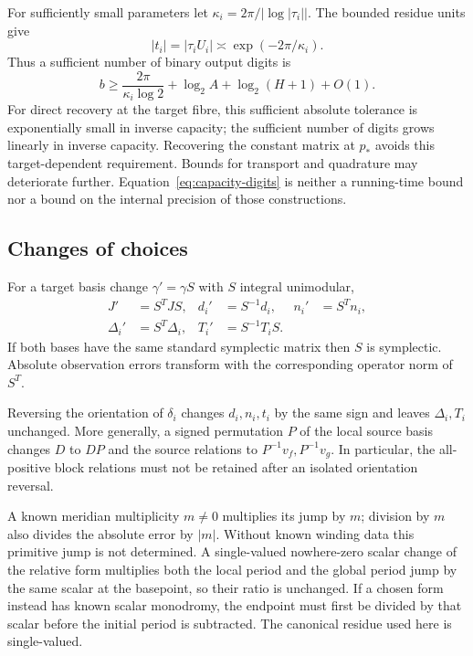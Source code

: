 For sufficiently small parameters let
$\kappa_i=2\pi/|\log|\tau_i||$. The bounded residue units give
\[
 |t_i|=|\tau_iU_i|\asymp
                     \exp(-2\pi/\kappa_i).
\]
Thus a sufficient number of binary output digits is
\begin{equation}\label{eq:capacity-digits}
 b\ge \frac{2\pi}{\kappa_i\log2}
       +\log_2A+\log_2(H+1)+O(1).
\end{equation}
For direct recovery at the target fibre, this sufficient absolute
tolerance is exponentially small in inverse capacity; the sufficient
number of digits grows linearly in inverse capacity. Recovering the
constant matrix at $p_*$ avoids this target-dependent requirement.
Bounds for transport and quadrature may deteriorate further.
Equation~\eqref{eq:capacity-digits} is neither a running-time bound
nor a bound on the internal precision of those constructions.

\subsection{Changes of choices}

For a target basis change $\gamma'=\gamma S$ with $S$ integral
unimodular,
\begin{equation}\label{eq:target-covariance}
 \begin{aligned}
 J'&=S^TJS,&d_i'&=S^{-1}d_i,& n_i'&=S^Tn_i,\\
 \Delta_i'&=S^T\Delta_i,&T_i'&=S^{-1}T_iS.
 \end{aligned}
\end{equation}
If both bases have the same standard symplectic matrix then $S$ is
symplectic. Absolute observation errors transform with the corresponding
operator norm of $S^T$.

Reversing the orientation of $\delta_i$ changes $d_i,n_i,t_i$ by
the same sign and leaves $\Delta_i,T_i$ unchanged. More generally,
a signed permutation $P$ of the local source basis changes $D$ to
$DP$ and the source relations to $P^{-1}v_f,P^{-1}v_g$. In
particular, the all-positive block relations must not be retained
after an isolated orientation reversal.

A known meridian multiplicity $m\ne0$ multiplies its jump by $m$;
division by $m$ also divides the absolute error by $|m|$. Without
known winding data this primitive jump is not determined. A
single-valued nowhere-zero scalar change of the relative form
multiplies both the local period and the global period jump by the
same scalar at the basepoint, so their ratio is unchanged. If a
chosen form instead has known scalar monodromy, the endpoint must
first be divided by that scalar before the initial period is
subtracted. The canonical residue used here is single-valued.

